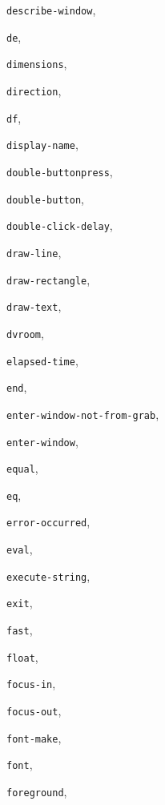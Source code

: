 \begin{theindex}
\item {\tt describe-window}, {\bf\pageref{describe-window}}
\item {\tt de}, {\bf\pageref{de}}
\item {\tt dimensions}, {\bf\pageref{dimensions}}
\item {\tt direction}, {\bf\pageref{direction}}
\item {\tt df}, {\bf\pageref{df}}
\item {\tt display-name}, {\bf\pageref{display-name}}
\item {\tt double-buttonpress}, {\bf\pageref{double-buttonpress}}
\item {\tt double-button}, {\bf\pageref{double-button}}
\item {\tt double-click-delay}, {\bf\pageref{double-click-delay}}
\item {\tt draw-line}, {\bf\pageref{draw-line}}
\item {\tt draw-rectangle}, {\bf\pageref{draw-rectangle}}
\item {\tt draw-text}, {\bf\pageref{draw-text}}
\item {\tt dvroom}, {\bf\pageref{dvroom}}
\item {\tt elapsed-time}, {\bf\pageref{elapsed-time}}
\item {\tt end}, {\bf\pageref{end}}
\item {\tt enter-window-not-from-grab}, {\bf\pageref{enter-window-not-from-grab}}
\item {\tt enter-window}, {\bf\pageref{enter-window}}
\item {\tt equal}, {\bf\pageref{equal}}
\item {\tt eq}, {\bf\pageref{eq}}
\item {\tt error-occurred}, {\bf\pageref{error-occurred}}
\item {\tt eval}, {\bf\pageref{eval}}
\item {\tt execute-string}, {\bf\pageref{execute-string}}
\item {\tt exit}, {\bf\pageref{exit}}
\item {\tt fast}, {\bf\pageref{fast}}
\item {\tt float}, {\bf\pageref{float}}
\item {\tt focus-in}, {\bf\pageref{focus-in}}
\item {\tt focus-out}, {\bf\pageref{focus-out}}
\item {\tt font-make}, {\bf\pageref{font-make}}
\item {\tt font}, {\bf\pageref{font}}
\item {\tt foreground}, {\bf\pageref{foreground}}

\end{theindex}
